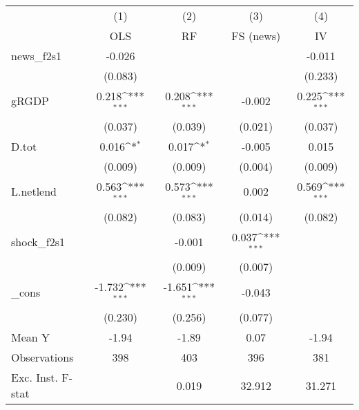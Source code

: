 {
\def\sym#1{\ifmmode^{#1}\else\(^{#1}\)\fi}
\begin{tabular}{l*{4}{c}}
\toprule
            &\multicolumn{1}{c}{(1)}&\multicolumn{1}{c}{(2)}&\multicolumn{1}{c}{(3)}&\multicolumn{1}{c}{(4)}\\
            &\multicolumn{1}{c}{OLS}&\multicolumn{1}{c}{RF}&\multicolumn{1}{c}{FS (news)}&\multicolumn{1}{c}{IV}\\
\midrule
news\_f2s1   &      -0.026         &                     &                     &      -0.011         \\
            &     (0.083)         &                     &                     &     (0.233)         \\
\addlinespace
gRGDP       &       0.218\sym{***}&       0.208\sym{***}&      -0.002         &       0.225\sym{***}\\
            &     (0.037)         &     (0.039)         &     (0.021)         &     (0.037)         \\
\addlinespace
D.tot       &       0.016\sym{*}  &       0.017\sym{*}  &      -0.005         &       0.015         \\
            &     (0.009)         &     (0.009)         &     (0.004)         &     (0.009)         \\
\addlinespace
L.netlend   &       0.563\sym{***}&       0.573\sym{***}&       0.002         &       0.569\sym{***}\\
            &     (0.082)         &     (0.083)         &     (0.014)         &     (0.082)         \\
\addlinespace
shock\_f2s1  &                     &      -0.001         &       0.037\sym{***}&                     \\
            &                     &     (0.009)         &     (0.007)         &                     \\
\addlinespace
\_cons      &      -1.732\sym{***}&      -1.651\sym{***}&      -0.043         &                     \\
            &     (0.230)         &     (0.256)         &     (0.077)         &                     \\
\midrule
Mean Y      &       -1.94         &       -1.89         &        0.07         &       -1.94         \\
Observations&         398         &         403         &         396         &         381         \\
Exc. Inst. F-stat&                     &       0.019         &      32.912         &      31.271         \\
\bottomrule
\end{tabular}
}
